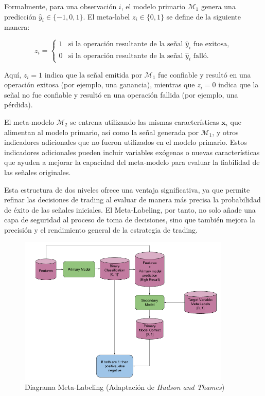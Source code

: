 \documentclass[a4paper,12pt, twoside]{report}
\begin{document}
Formalmente, para una observación $i$, el modelo primario $\mathcal{M}_1$ genera 
una predicción $\hat{y}_i \in \{-1, 0, 1\}$. El meta-label $z_i \in \{0, 1\}$ se 
define de la siguiente manera:

\[
z_i = \begin{cases} 
1 & \text{si la operación resultante de la señal } \hat{y}_i \text{ fue exitosa}, \\
0 & \text{si la operación resultante de la señal } \hat{y}_i \text{ falló}.
\end{cases}
\]

Aquí, $z_i = 1$ indica que la señal emitida por $\mathcal{M}_1$ fue confiable y 
resultó en una operación exitosa (por ejemplo, una ganancia), mientras que $z_i = 0$ 
indica que la señal no fue confiable y resultó en una operación fallida (por ejemplo, 
una pérdida).

El meta-modelo $\mathcal{M}_2$ se entrena utilizando las mismas características 
$\mathbf{x}_i$ que alimentan al modelo primario, así como la señal generada por 
$\mathcal{M}_1$, y otros indicadores adicionales que no fueron utilizados en el
modelo primario. Estos indicadores adicionales pueden incluir variables exógenas 
o nuevas características que ayuden a mejorar la capacidad del meta-modelo para 
evaluar la fiabilidad de las señales originales.

Esta estructura de dos niveles ofrece una ventaja significativa, ya que permite 
refinar las decisiones de trading al evaluar de manera más precisa la 
probabilidad de éxito de las señales iniciales. El Meta-Labeling, por tanto, 
no solo añade una capa de seguridad al proceso de toma de decisiones, sino 
que también mejora la precisión y el rendimiento general de la estrategia de trading.

\begin{figure}[H]
    \centering
    \includegraphics[width=0.9\textwidth]{./figures/meta_labeling.png}
    \caption{Diagrama Meta-Labeling (Adaptación de \textit{Hudson and Thames})}
    \label{fig:meta_labeling_diagram}
\end{figure}
\end{document}
